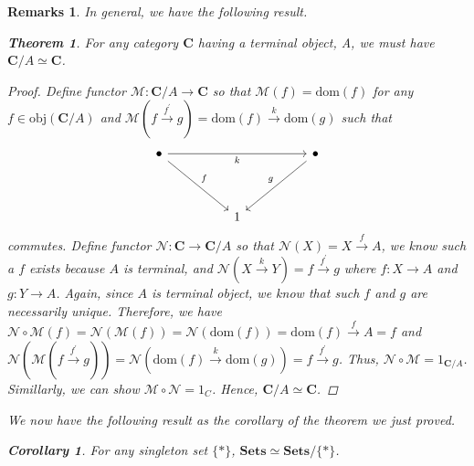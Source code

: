 \documentclass[a4paper, 11pt]{book}
\theoremstyle{plain}
\newtheorem*{remarks}{Remarks}
\newtheorem*{theorem}{Theorem}
\newtheorem*{Corollary}{Corollary}
\theoremstyle{plain}
\newcommand{\mb}{\mathbf}
\newcommand{\arr}{\rightarrow}
\newcommand{\dom}{\text{dom}}
\newcommand{\p}{\prime}
\newcommand{\obj}{\text{obj}}
\newcommand{\mc}{\mathcal}
\newcommand{\warr}{\xrightarrow}
\newcommand{\C}{\mathbf{C}}
\begin{document}
    \begin{remarks} In general, we have the following result. 
      \begin{theorem} For any category $\mb{C}$ having a terminal object, A, we must have $\mb{C}/A \simeq \mb{C}$. 
      \end{theorem}
      \begin{proof}
        Define functor $\mc{M}:\C/A \arr \C$ so that $\mc{M}(f)=\dom(f)$ for any $f \in \obj(\C/A)$ and $\mc{M}(f \warr{f^\p} g)=\dom(f) \warr{k} \dom(g)$ such that 
        \[\begin{tikzcd}
          \bullet &&&& \bullet \\
          \\
          && 1
          \arrow["f", from=1-1, to=3-3]
          \arrow["k"', from=1-1, to=1-5]
          \arrow["g"', from=1-5, to=3-3]
        \end{tikzcd}\]
        commutes. Define functor $\mc{N}:\C \arr \C/A$ so that $\mc{N}(X)=X \warr{f} A$, we know such a $f$ exists because $A$ is terminal, and $\mc{N} (X \warr{k} Y)=f \warr{f^\p} g$ where $f:X \arr A$ and $g:Y \arr A$. Again, since $A$ is terminal object, we know that such $f$ and $g$ are necessarily unique. Therefore, we have $\mc{N} \circ \mc{M} (f)=\mc{N} (\mc{M}(f))=\mc{N}(\dom(f))=\dom(f) \warr{f} A=f$ and $\mc{N} (\mc{M} (f \warr{f^\p} g))=\mc{N} (\dom(f) \warr{k} \dom(g))=f \warr{f^\p} g$. Thus, $\mc{N} \circ \mc{M}=1_{\C/A}$. Simillarly, we can show $\mc{M} \circ \mc{N}=1_C$. Hence, $\mb{C}/A \simeq \mb{C}$.
      \end{proof}
      We now have the following result as the corollary of the theorem we just proved. 
      \begin{Corollary}
        For any singleton set $\{*\}$, $\mb{Sets} \simeq \mb{Sets}/\{*\}$.
      \end{Corollary}
    \end{remarks}
\end{document}

